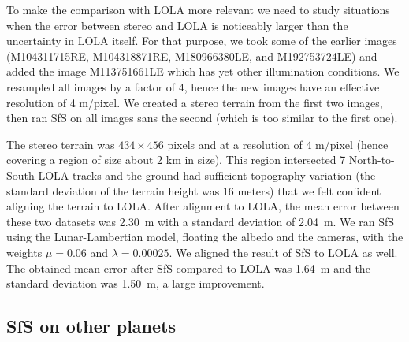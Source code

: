\documentclass[12pt,oneside]{article}
\begin{document}
To make the comparison with LOLA more relevant we need to study situations when the error
between stereo and LOLA is noticeably larger than the uncertainty in LOLA itself. For that purpose,
we took some of the earlier images (M104311715RE, M104318871RE, M180966380LE, and M192753724LE)
and added the image M113751661LE which has yet other illumination conditions. We resampled all images
by a factor of 4, hence the new images have an effective resolution of 4 m/pixel. We created
a stereo terrain from the first two images, then ran SfS on all images sans the second (which is
too similar to the first one). 

The stereo terrain was $434\times 456$ pixels and at a resolution of 4 m/pixel
(hence covering a region of size about 2 km in size). This region intersected 7 North-to-South LOLA tracks
and the ground had sufficient topography variation (the standard deviation of the terrain height was 16 meters)
that we felt confident aligning the terrain to LOLA. After alignment to LOLA, the mean error
between these two datasets was 2.30~m with a standard deviation of 2.04~m. We ran SfS using
the Lunar-Lambertian model, floating the albedo and the cameras, with the weights $\mu=0.06$
and $\lambda=0.00025.$ We aligned the result of SfS to LOLA as well. The obtained mean error after SfS
compared to LOLA was 1.64~m and the standard deviation was 1.50~m, a large improvement. 

\subsection{SfS on other planets}
\end{document}

